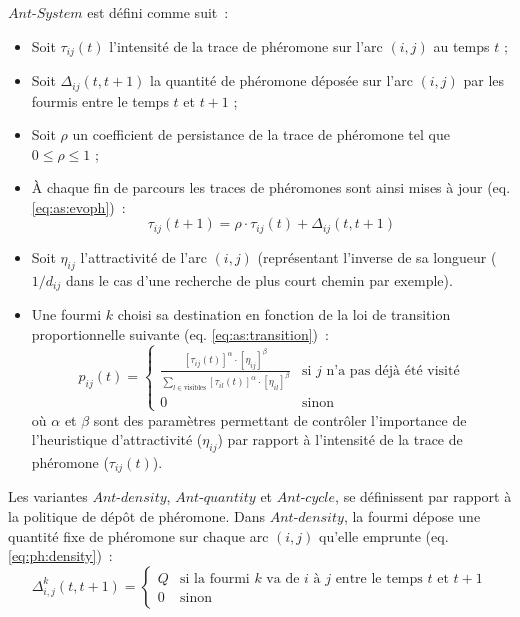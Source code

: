 $Ant$-$System$ est défini comme suit~: 
\begin{itemize}
  \item Soit $\tau_{ij}(t)$ l'intensité de la trace de phéromone sur l'arc $(i,j)$ au temps $t$ ;
  \item Soit $\Delta_{ij}(t,t+1)$ la quantité de phéromone déposée sur l'arc $(i,j)$ par les fourmis entre le temps $t$ et $t+1$ ;
  \item Soit $\rho$ un coefficient de persistance de la trace de phéromone tel que $0\leq\rho\leq1$ ;
  \item À chaque fin de parcours les traces de phéromones sont ainsi mises à jour (eq. \ref{eq:as:evoph})~: 
  \begin{equation}
    \tau_{ij}(t+1)=\rho\cdot\tau_{ij}(t)+\Delta_{ij}(t,t+1)
    \label{eq:as:evoph}
  \end{equation}
  \item Soit $\eta_{ij}$ l'attractivité de l'arc $(i,j)$ (représentant l'inverse de sa longueur ($1/d_{ij}$ dans le cas d'une recherche de plus court chemin par exemple).
  \item Une fourmi $k$ choisi sa destination en fonction de la loi de transition proportionnelle suivante (eq. \ref{eq:as:transition})~: 
  \begin{equation}
   p_{ij}(t) =
   \begin{cases}
    \frac{[\tau_{ij}(t)]^\alpha\cdot[\eta_{ij}]^\beta}{\sum\limits_{l \in \text{visibles}} [\tau_{il}(t)]^\alpha\cdot[\eta_{il}]^\beta} & \text{si } j \text{ n'a pas déjà été visité}\\
    0 & \text{sinon}
   \end{cases}
   \label{eq:as:transition}
  \end{equation}
  où $\alpha$ et $\beta$ sont des paramètres permettant de contrôler l'importance de l'heuristique d'attractivité ($\eta_{ij}$) par rapport à l'intensité de la trace de phéromone ($\tau_{ij}(t)$).
\end{itemize}

Les variantes $Ant$-$density$, $Ant$-$quantity$ et $Ant$-$cycle$, se définissent par rapport à la politique de dépôt de phéromone.
Dans $Ant$-$density$, la fourmi dépose une quantité fixe de phéromone sur chaque arc $(i,j)$ qu'elle emprunte (eq. \ref{eq:ph:density})~:
\begin{equation}
 \Delta_{i,j}^k(t,t+1)=
  \begin{cases}
    Q & \text{si la fourmi } k \text{ va de } i \text{ à } j \text{ entre le temps } t \text{ et } t+1\\
    0 & \text{sinon}
  \end{cases}
  \label{eq:ph:density}
\end{equation}

